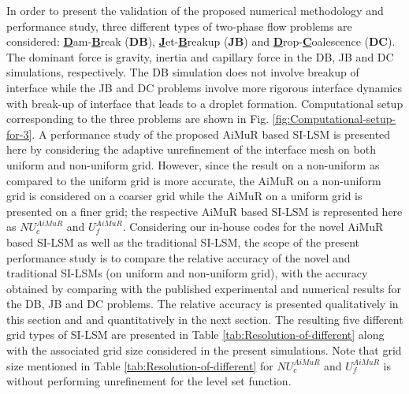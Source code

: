 \documentclass[preprint,12pt]{elsarticle}
\begin{document}
In order to present the validation of the proposed numerical methodology
and performance study, three different types of two-phase flow problems are considered: \textbf{\underline{D}}am-\textbf{\underline{B}}reak
(\textbf{DB}), \textbf{\underline{J}}et-\textbf{\underline{B}}reakup
(\textbf{JB}) and \textbf{\underline{D}}rop-\textbf{\underline{C}}oalescence
(\textbf{DC}). The dominant force is gravity, inertia and capillary force in the DB, JB and DC simulations, respectively. The DB simulation does not involve breakup of interface while the JB and DC problems involve more rigorous interface dynamics with break-up of interface that leads to a droplet formation. Computational setup corresponding to the three problems are shown in Fig.
\ref{fig:Computational-setup-for-3}. A performance study of the proposed AiMuR based SI-LSM is presented here by considering the adaptive unrefinement of the interface mesh on both uniform and non-uniform grid. However, since the result on a non-uniform as compared to the uniform grid is more accurate, the AiMuR on a non-uniform grid is considered on a coarser grid while the AiMuR on a uniform grid is presented on a finer grid; the respective AiMuR based SI-LSM is represented here as  $NU_{c}^{AiMuR}$ and $U_{f}^{AiMuR}$. Considering our in-house codes for the novel AiMuR based SI-LSM as well as the traditional SI-LSM, the scope of the present performance study is to compare the relative accuracy of the novel and traditional SI-LSMs (on uniform and non-uniform grid), with the accuracy obtained by comparing with the published experimental and numerical results for the DB, JB and DC problems. The relative accuracy is presented qualitatively in this section and and quantitatively in the next section. The resulting five different grid types of SI-LSM are presented in Table \ref{tab:Resolution-of-different} along with the associated grid size considered in the present simulations. Note that grid size mentioned in Table \ref{tab:Resolution-of-different} for $NU_{c}^{AiMuR}$ and $U_{f}^{AiMuR}$ is without performing unrefinement for the level set function.
\end{document}
